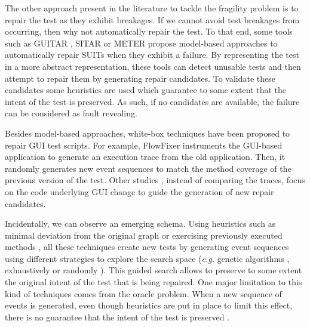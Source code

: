 The other approach present in the literature to tackle the fragility problem is to repair the test as they exhibit breakages. If we cannot avoid test breakages from occurring, then why not automatically repair the test. To that end, some tools such as GUITAR \cite{Memon2008}, SITAR \cite{Gao2016} or METER \cite{Pan2020} propose model-based approaches to automatically repair SUITs when they exhibit a failure. By representing the test in a more abstract representation, these tools can detect unusable tests and then attempt to repair them by generating repair candidates. To validate these candidates some heuristics are used which guarantee to some extent that the intent of the test is preserved. As such, if no candidates are available, the failure can be considered as fault revealing.

Besides model-based approaches, white-box techniques have been proposed to repair GUI test scripts. For example, FlowFixer \cite{Zhang2013} instruments the GUI-based application to generate an execution trace from the old application. Then, it randomly generates new event sequences to match the method coverage of the previous version of the test. Other studies \cite{Grechanik2009, Fu2009}, instead of comparing the traces, focus on the code underlying GUI change to guide the generation of new repair candidates.

Incidentally, we can observe an emerging schema. Using heuristics such as minimal deviation from the original graph\cite{Gao2016} or exercising previously executed methods \cite{Zhang2013}, all these techniques create new tests by generating event sequences using different strategies  to explore the search space (\emph{e.g.} genetic algorithms \cite{Huang2010}, exhaustively \cite{Memon2008} or randomly \cite{Zhang2013}). This guided search allows to preserve to some extent the original intent of the test that is being repaired. One major limitation to this kind of techniques comes from the oracle problem. When a new sequence of events is generated, even though heuristics are put in place to limit this effect, there is no guarantee that the intent of the test is preserved \cite{Li2019}.


